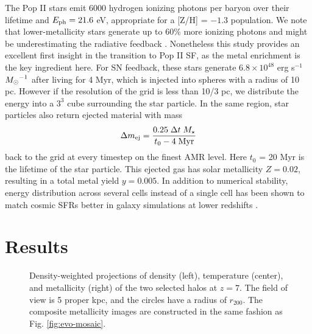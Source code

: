 \documentclass[apjl]{emulateapj}
\begin{document}
The Pop II stars emit 6000 hydrogen ionizing photons per baryon over
their lifetime and $E_{\rm ph} = 21.6$ eV, appropriate for a [Z/H] =
$-1.3$ population.  We note that lower-metallicity stars generate up
to 60\% more ionizing photons and might be underestimating the
radiative feedback \citep{Schaerer03}.  Nonetheless this study
provides an excellent first insight in the transition to Pop II SF, as
the metal enrichment is the key ingredient here.  For SN feedback,
these stars generate $6.8 \times 10^{48}$ erg s$^{-1}$ $\Ms^{-1}$
after living for 4 Myr, which is injected into spheres with a radius
of 10 pc.  However if the resolution of the grid is less than 10/3 pc,
we distribute the energy into a $3^3$ cube surrounding the star
particle.  In the same region, star particles also return ejected
material with mass
%
\begin{equation}
  \label{eqn:SNmass}
  \Delta m_{\rm ej} = \frac{0.25 \; \Delta t \; M_\star} 
         {t_0 - 4\;\mathrm{Myr}}
\end{equation}
back to the grid at every timestep on the finest AMR level.  Here
$t_0$ = 20 Myr is the lifetime of the star particle.  This ejected gas
has solar metallicity $Z = 0.02$, resulting in a total metal yield $y
= 0.005$.  In addition to numerical stability, energy distribution
across several cells instead of a single cell has been shown to match
cosmic SFRs better in galaxy simulations at lower redshifts
\citep{Smith11}.

\section{Results}
\label{sec:results}




\begin{figure}
  \caption{\label{fig:halo-mosaic} Density-weighted projections of
    density (left), temperature (center), and metallicity (right) of
    the two selected halos at $z=7$.  The field of view is 5 proper
    kpc, and the circles have a radius of $r_{200}$.  The composite
    metallicity images are constructed in the same fashion as
    Fig. \ref{fig:evo-mosaic}.}
\end{figure}


\end{document}
